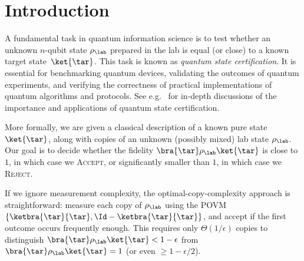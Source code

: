 \DeclarePairedDelimiterX{}
\newcommand{\Del}[3]{\Delta_{#1}\diverg{#2}{#3}}
\newcommand{\EFid}[3]{\mathrm{EFid}_{#1}\diverg{#2}{#3}}

\newcommand{\ketbb}{\ket{\smash{b^\bot}}}
\newcommand{\tpO}{\smash{\widetilde{\smash{\psi}}^0}}
\newcommand{\ktpO}
{\ket{\tpO}}
\newcommand{\tpI}{\smash{\widetilde{\smash{\psi}}^1}}
\newcommand{\ktpI}
{\ket{\tpI}}
\newcommand{\tfO}{\smash{\widetilde{\phi}^0}}
\newcommand{\ktfO}
{\ket{\tfO}}
\newcommand{\tfI}{\smash{\widetilde{\phi}^1}}
\newcommand{\ktfI}
{\ket{\tfI}}
\newcommand{\psip}{\smash{\psi'}}
\newcommand{\phip}{\smash{\phi'}}
\newcommand{\tarp}{\smash{\overline{\tar}}}
\newcommand{\labp}{\smash{\overline{\lab}}}
\newcommand{\tarz}{\smash{\tar^{0}}}
\newcommand{\taro}{\smash{\tar^{1}}}
\newcommand{\labz}{\smash{\lab^{0}}}
\newcommand{\labo}{\smash{\lab^{1}}}

\section{Introduction}
A fundamental task in quantum information science is to test whether an unknown $n$-qubit state $\rho_{\lab}$ prepared in the lab is equal (or close) to a known target state~$\ket{\tar}$. This task is known as \emph{quantum state certification}. It is essential for benchmarking quantum devices, validating the outcomes of quantum experiments, and verifying the correctness of practical implementations of quantum algorithms and protocols. See e.g.\ \cite{buadescu2019quantum, zhu2019statistical, kliesch2021theory, huang2024certifying} for in-depth discussions of the importance and applications of quantum state certification. 

More formally, we are given a classical description of a known pure state $\ket{\tar}$, along with copies of an unknown (possibly mixed) lab state $\rho_{\lab}$. Our goal is to decide whether the fidelity $\bra{\tar}\rho_{\lab}\ket{\tar}$ is close to $1$, in which case we \textsc{Accept}, or significantly smaller than $1$, in which case we \textsc{Reject}.

If we ignore measurement complexity, the optimal-copy-complexity approach is straightforward: measure each copy of $\rho_{\lab}$ using the POVM $\{\ketbra{\tar}{\tar}, \Id - \ketbra{\tar}{\tar}\}$, and accept if the first outcome occurs frequently enough. This requires only $\Theta(1/\epsilon)$ copies to distinguish $\bra{\tar}\rho_{\lab}\ket{\tar} < 1 - \epsilon$ from $\bra{\tar}\rho_{\lab}\ket{\tar} = 1$ (or even $\geq 1 - \epsilon/2$).


